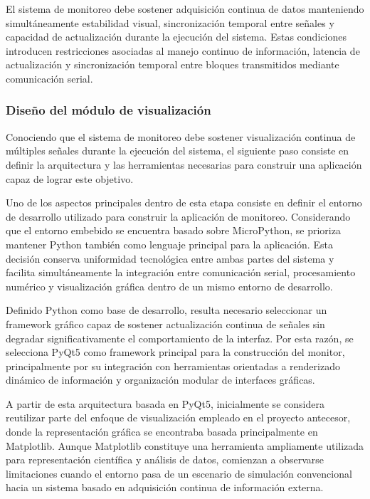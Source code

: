 El sistema de monitoreo debe sostener adquisición continua de datos manteniendo simultáneamente estabilidad visual, sincronización temporal entre señales y capacidad de actualización durante la ejecución del sistema. Estas condiciones introducen restricciones asociadas al manejo continuo de información, latencia de actualización y sincronización temporal entre bloques transmitidos mediante comunicación serial.


\subsubsection{Diseño del módulo de visualización}

Conociendo que el sistema de monitoreo debe sostener visualización continua de múltiples señales durante la ejecución del sistema, el siguiente paso consiste en definir la arquitectura y las herramientas necesarias para construir una aplicación capaz de lograr este objetivo.

Uno de los aspectos principales dentro de esta etapa consiste en definir el entorno de desarrollo utilizado para construir la aplicación de monitoreo. Considerando que el entorno embebido se encuentra basado sobre MicroPython, se prioriza mantener Python también como lenguaje principal para la aplicación. Esta decisión conserva uniformidad tecnológica entre ambas partes del sistema y facilita simultáneamente la integración entre comunicación serial, procesamiento numérico y visualización gráfica dentro de un mismo entorno de desarrollo.

Definido Python como base de desarrollo, resulta necesario seleccionar un framework gráfico capaz de sostener actualización continua de señales sin degradar significativamente el comportamiento de la interfaz. Por esta razón, se selecciona PyQt5 como framework principal para la construcción del monitor, principalmente por su integración con herramientas orientadas a renderizado dinámico de información y organización modular de interfaces gráficas.

A partir de esta arquitectura basada en PyQt5, inicialmente se considera reutilizar parte del enfoque de visualización empleado en el proyecto antecesor, donde la representación gráfica se encontraba basada principalmente en Matplotlib. Aunque Matplotlib constituye una herramienta ampliamente utilizada para representación científica y análisis de datos, comienzan a observarse limitaciones cuando el entorno pasa de un escenario de simulación convencional hacia un sistema basado en adquisición continua de información externa.

